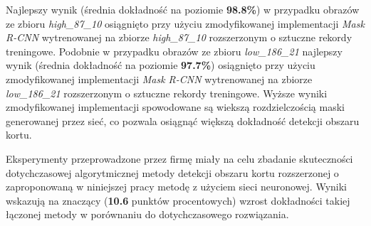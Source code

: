 Najlepszy wynik (średnia dokładność na poziomie \textbf{98.8\%}) w przypadku obrazów ze zbioru \textit{high\_87\_10} osiągnięto przy użyciu zmodyfikowanej implementacji \textit{Mask R-CNN} wytrenowanej na zbiorze \textit{high\_87\_10} rozszerzonym o sztuczne rekordy treningowe. Podobnie w przypadku obrazów ze zbioru \textit{low\_186\_21} najlepszy wynik (średnia dokładność na poziomie \textbf{97.7\%}) osiągnięto przy użyciu zmodyfikowanej implementacji \textit{Mask R-CNN} wytrenowanej na zbiorze \textit{low\_186\_21} rozszerzonym o sztuczne rekordy treningowe. Wyższe wyniki zmodyfikowanej implementacji spowodowane są wiekszą rozdzielczością maski generowanej przez sieć, co pozwala osiągnąć większą dokładność detekcji obszaru kortu.

Eksperymenty przeprowadzone przez firmę \blue{} miały na celu zbadanie skuteczności dotychczasowej algorytmicznej metody detekcji obszaru kortu rozszerzonej o zaproponowaną w niniejszej pracy metodę z użyciem sieci neuronowej. Wyniki wskazują na znaczący (\textbf{10.6} punktów procentowych) wzrost dokładności takiej łączonej metody w porównaniu do dotychczasowego rozwiązania.
